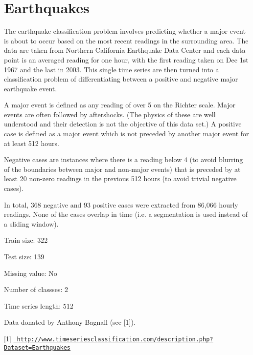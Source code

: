 \chapter{Earthquakes}
\hypertarget{md_external_2data_2UCRArchive__2018_2Earthquakes_2README}{}\label{md_external_2data_2UCRArchive__2018_2Earthquakes_2README}
\label{md_external_2data_2UCRArchive__2018_2Earthquakes_2README_autotoc_md57}%
%
 The earthquake classification problem involves predicting whether a major event is about to occur based on the most recent readings in the surrounding area. The data are taken from Northern California Earthquake Data Center and each data point is an averaged reading for one hour, with the first reading taken on Dec 1st 1967 and the last in 2003. This single time series are then turned into a classification problem of differentiating between a positive and negative major earthquake event.

A major event is defined as any reading of over 5 on the Richter scale. Major events are often followed by aftershocks. (The physics of these are well understood and their detection is not the objective of this data set.) A positive case is defined as a major event which is not preceded by another major event for at least 512 hours.

Negative cases are instances where there is a reading below 4 (to avoid blurring of the boundaries between major and non-\/major events) that is preceded by at least 20 non-\/zero readings in the previous 512 hours (to avoid trivial negative cases).

In total, 368 negative and 93 positive cases were extracted from 86,066 hourly readings. None of the cases overlap in time (i.\+e. a segmentation is used instead of a sliding window).

Train size\+: 322

Test size\+: 139

Missing value\+: No

Number of classses\+: 2

Time series length\+: 512

Data donated by Anthony Bagnall (see \mbox{[}1\mbox{]}).

\mbox{[}1\mbox{]} \href{http://www.timeseriesclassification.com/description.php?Dataset=Earthquakes}{\texttt{ http\+://www.\+timeseriesclassification.\+com/description.\+php?\+Dataset=\+Earthquakes}} 